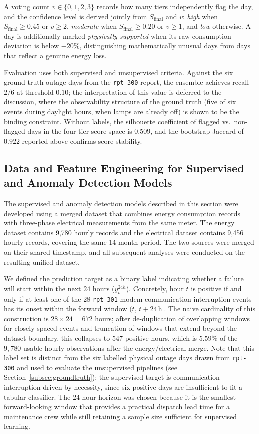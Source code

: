 \documentclass{article}
\begin{document}
A voting count $v\in\{0,1,2,3\}$ records how many tiers independently flag the day, and the confidence level is derived jointly from $S_{\text{final}}$ and $v$: \textit{high} when $S_{\text{final}}\geq0.45$ or $v\geq2$, \textit{moderate} when $S_{\text{final}}\geq0.20$ or $v\geq1$, and \textit{low} otherwise. A day is additionally marked \textit{physically supported} when its raw consumption deviation is below $-20\%$, distinguishing mathematically unusual days from days that reflect a genuine energy loss.


Evaluation uses both supervised and unsupervised criteria. Against the six ground-truth outage days from the \texttt{rpt-300} report, the ensemble achieves recall $2/6$ at threshold $0.10$; the interpretation of this value is deferred to the discussion, where the observability structure of the ground truth (five of six events during daylight hours, when lamps are already off) is shown to be the binding constraint. Without labels, the silhouette coefficient \cite{rousseeuw1987silhouettes} of flagged vs.\ non-flagged days in the four-tier-score space is $0.509$, and the bootstrap Jaccard of $0.922$ reported above confirms score stability.
\subsection{Data and Feature Engineering for Supervised and Anomaly Detection Models}

The supervised and anomaly detection models described in this section were developed using a merged dataset that combines energy consumption records with three-phase electrical measurements from the same meter. The energy dataset contains 9,780 hourly records and the electrical dataset contains 9,456 hourly records, covering the same 14-month period. The two sources were merged on their shared timestamp, and all subsequent analyses were conducted on the resulting unified dataset.

We defined the prediction target as a binary label indicating whether a failure will start within the next $24$ hours ($y^{24h}_t$). Concretely, hour $t$ is positive if and only if at least one of the $28$ \texttt{rpt-301} modem communication interruption events has its onset within the forward window $(t,\,t+24\,\text{h}]$. The naive cardinality of this construction is $28 \times 24 = 672$ hours; after de-duplication of overlapping windows for closely spaced events and truncation of windows that extend beyond the dataset boundary, this collapses to $547$ positive hours, which is $5.59\%$ of the $9{,}780$ usable hourly observations after the energy/electrical merge. Note that this label set is distinct from the six labelled physical outage days drawn from \texttt{rpt-300} and used to evaluate the unsupervised pipelines (see Section~\ref{subsec:groundtruth}); the supervised target is communication-interruption-driven by necessity, since six positive days are insufficient to fit a tabular classifier. The $24$-hour horizon was chosen because it is the smallest forward-looking window that provides a practical dispatch lead time for a maintenance crew while still retaining a sample size sufficient for supervised learning.
\end{document}

